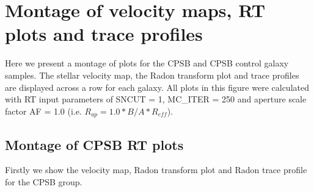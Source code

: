 \documentclass[fleqn,usenatbib]{mnras}
\begin{document}
\section{Montage of velocity maps, RT plots and trace profiles}
\label{composites}
Here we present a montage of plots for the CPSB and CPSB control galaxy samples. The stellar velocity map, the Radon transform plot and trace profiles are displayed across a row for each galaxy. All plots in this figure were calculated with RT input parameters of SNCUT = 1, MC\_ITER = 250 and aperture scale factor AF = 1.0 (i.e. $R_{ap}=1.0*B/A*R_{eff}$).

\subsection{Montage of CPSB RT plots}
Firstly we show the velocity map, Radon transform plot and Radon trace profile for the CPSB group.
\end{document}
